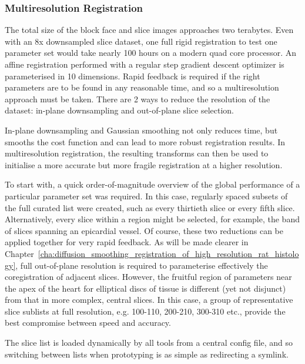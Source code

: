     \subsubsection{Multiresolution Registration} %
    \label{ssub:multiresolution_registration}
			The total size of the block face and slice images approaches two terabytes. Even with an 8x downsampled slice dataset, one full rigid registration to test one parameter set would take nearly 100 hours on a modern quad core processor. An affine registration performed with a regular step gradient descent optimizer is parameterised in 10 dimensions. Rapid feedback is required if the right parameters are to be found in any reasonable time, and so a multiresolution approach must be taken. There are 2 ways to reduce the resolution of the dataset: in-plane downsampling and out-of-plane slice selection.
			
      In-plane downsampling and Gaussian smoothing not only reduces time, but smooths the cost function and can lead to more robust registration results. In multiresolution registration, the resulting transforms can then be used to initialise a more accurate but more fragile registration at a higher resolution.
			
      To start with, a quick order-of-magnitude overview of the global performance of a particular parameter set was required. In this case, regularly spaced subsets of the full curated list were created, such as every thirtieth slice or every fifth slice. Alternatively, every slice within a region might be selected, for example, the band of slices spanning an epicardial vessel. Of course, these two reductions can be applied together for very rapid feedback. As will be made clearer in Chapter~\ref{cha:diffusion_smoothing_registration_of_high_resolution_rat_histology}, full out-of-plane resolution is required to parameterise effectively the coregistration of adjacent slices. However, the fruitful region of parameters near the apex of the heart for elliptical discs of tissue is different (yet not disjunct) from that in more complex, central slices. In this case, a group of representative slice sublists at full resolution, e.g. 100-110, 200-210, 300-310 etc., provide the best compromise between speed and accuracy.
			
			The slice list is loaded dynamically by all tools from a central config file, and so switching between lists when prototyping is as simple as redirecting a symlink.
    

